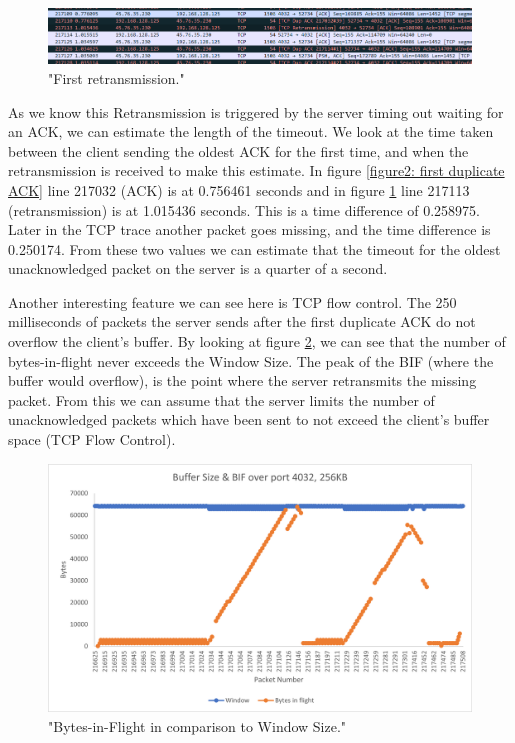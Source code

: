 \documentclass[12pt]{article}
\begin{document}
\begin{figure}[!htbp]
  \centering
  \includegraphics[width=\linewidth]{4032-256KB-retransmission.PNG}
  \caption{"First retransmission."}
  \label{figure4: First retransmission}
\end{figure}

As we know this Retransmission is triggered by the server timing out waiting for an ACK, we can estimate the length of the timeout.
We look at the time taken between the client sending the oldest ACK for the first time, and when the retransmission is received to make this estimate.
In figure \ref{figure2: first duplicate ACK} line 217032 (ACK) is at 0.756461 seconds and in figure \ref{figure4: First retransmission} line 217113 (retransmission) is at 1.015436 seconds.
This is a time difference of 0.258975.
Later in the TCP trace another packet goes missing, and the time difference is 0.250174.
From these two values we can estimate that the timeout for the oldest unacknowledged packet on the server is a quarter of a second.

Another interesting feature we can see here is TCP flow control.
The 250 milliseconds of packets the server sends after the first duplicate ACK do not overflow the client's buffer.
By looking at figure \ref{figure3: BIF and Window Size}, we can see that the number of bytes-in-flight never exceeds the Window Size.
The peak of the BIF (where the buffer would overflow), is the point where the server retransmits the missing packet.
From this we can assume that the server limits the number of unacknowledged packets which have been sent to not exceed the client's buffer space (TCP Flow Control).

\begin{figure}[!htbp]
  \centering
  \includegraphics[width=\linewidth]{4032-256KB-bytes-in-flight.png}
  \caption{"Bytes-in-Flight in comparison to Window Size."}
  \label{figure3: BIF and Window Size}
\end{figure}
\end{document}
